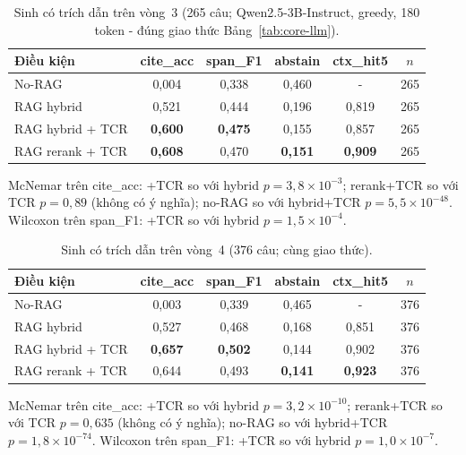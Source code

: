 \documentclass[11pt,a4paper]{article}
\begin{document}
\begin{table}[t]
\centering\small
\caption{Sinh có trích dẫn trên vòng~3 (265 câu; Qwen2.5-3B-Instruct, greedy, 180 token - đúng giao thức Bảng~\ref{tab:core-llm}).}
\label{tab:ext3-llm}
\setlength{\tabcolsep}{3.6pt}
\begin{tabular}{lccccc}
\toprule
Điều kiện & cite\_acc & span\_F1 & abstain & ctx\_hit5 & $n$ \\
\midrule
No-RAG & 0,004 & 0,338 & 0,460 & - & 265 \\
RAG hybrid & 0,521 & 0,444 & 0,196 & 0,819 & 265 \\
RAG hybrid + TCR & \textbf{0,600} & \textbf{0,475} & 0,155 & 0,857 & 265 \\
RAG rerank + TCR & \textbf{0,608} & 0,470 & \textbf{0,151} & \textbf{0,909} & 265 \\
\bottomrule
\end{tabular}

\vspace{3pt}
{\footnotesize McNemar trên cite\_acc: +TCR so với hybrid $p=3{,}8\times10^{-3}$; rerank+TCR so với TCR $p=0{,}89$ (không có ý nghĩa); no-RAG so với hybrid+TCR $p=5{,}5\times10^{-48}$. Wilcoxon trên span\_F1: +TCR so với hybrid $p=1{,}5\times10^{-4}$.}
\end{table}

\begin{table}[t]
\centering\small
\caption{Sinh có trích dẫn trên vòng~4 (376 câu; cùng giao thức).}
\label{tab:ext4-llm}
\setlength{\tabcolsep}{3.6pt}
\begin{tabular}{lccccc}
\toprule
Điều kiện & cite\_acc & span\_F1 & abstain & ctx\_hit5 & $n$ \\
\midrule
No-RAG & 0,003 & 0,339 & 0,465 & - & 376 \\
RAG hybrid & 0,527 & 0,468 & 0,168 & 0,851 & 376 \\
RAG hybrid + TCR & \textbf{0,657} & \textbf{0,502} & 0,144 & 0,902 & 376 \\
RAG rerank + TCR & 0,644 & 0,493 & \textbf{0,141} & \textbf{0,923} & 376 \\
\bottomrule
\end{tabular}

\vspace{3pt}
{\footnotesize McNemar trên cite\_acc: +TCR so với hybrid $p=3{,}2\times10^{-10}$; rerank+TCR so với TCR $p=0{,}635$ (không có ý nghĩa); no-RAG so với hybrid+TCR $p=1{,}8\times10^{-74}$. Wilcoxon trên span\_F1: +TCR so với hybrid $p=1{,}0\times10^{-7}$.}
\end{table}
\end{document}
